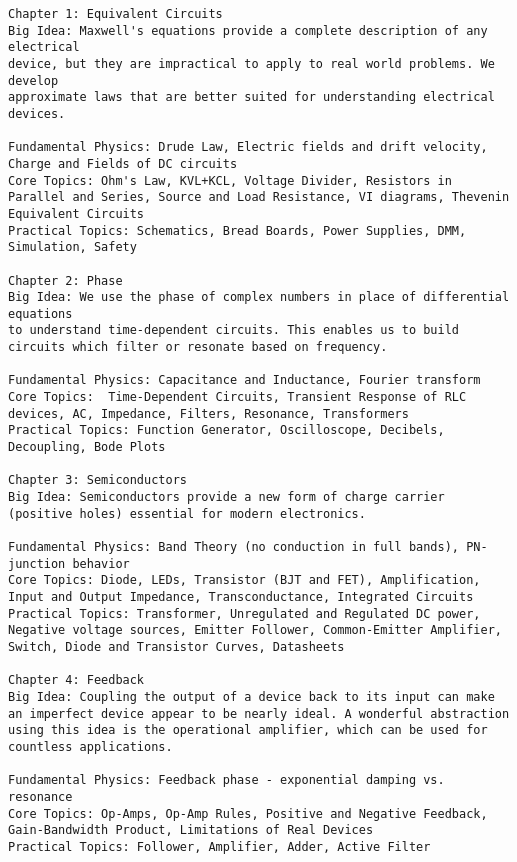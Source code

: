 \documentclass[12pt,oneside]{book}
\begin{document}
\begin{verbatim}
Chapter 1: Equivalent Circuits
Big Idea: Maxwell's equations provide a complete description of any electrical
device, but they are impractical to apply to real world problems. We develop
approximate laws that are better suited for understanding electrical devices.

Fundamental Physics: Drude Law, Electric fields and drift velocity, Charge and Fields of DC circuits
Core Topics: Ohm's Law, KVL+KCL, Voltage Divider, Resistors in Parallel and Series, Source and Load Resistance, VI diagrams, Thevenin Equivalent Circuits
Practical Topics: Schematics, Bread Boards, Power Supplies, DMM, Simulation, Safety

Chapter 2: Phase
Big Idea: We use the phase of complex numbers in place of differential equations
to understand time-dependent circuits. This enables us to build circuits which filter or resonate based on frequency.

Fundamental Physics: Capacitance and Inductance, Fourier transform
Core Topics:  Time-Dependent Circuits, Transient Response of RLC devices, AC, Impedance, Filters, Resonance, Transformers
Practical Topics: Function Generator, Oscilloscope, Decibels, Decoupling, Bode Plots 

Chapter 3: Semiconductors
Big Idea: Semiconductors provide a new form of charge carrier (positive holes) essential for modern electronics.

Fundamental Physics: Band Theory (no conduction in full bands), PN-junction behavior
Core Topics: Diode, LEDs, Transistor (BJT and FET), Amplification, Input and Output Impedance, Transconductance, Integrated Circuits
Practical Topics: Transformer, Unregulated and Regulated DC power, Negative voltage sources, Emitter Follower, Common-Emitter Amplifier, Switch, Diode and Transistor Curves, Datasheets

Chapter 4: Feedback
Big Idea: Coupling the output of a device back to its input can make an imperfect device appear to be nearly ideal. A wonderful abstraction using this idea is the operational amplifier, which can be used for countless applications.

Fundamental Physics: Feedback phase - exponential damping vs. resonance
Core Topics: Op-Amps, Op-Amp Rules, Positive and Negative Feedback, Gain-Bandwidth Product, Limitations of Real Devices
Practical Topics: Follower, Amplifier, Adder, Active Filter
\end{verbatim}
\end{document}
